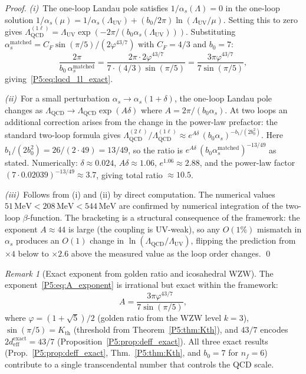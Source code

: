 \documentclass[11pt,a4paper]{article}
\theoremstyle{definition}
\theoremstyle{remark}
\newtheorem{remark}[theorem]{Remark}
\newcommand{\vp}{\varphi}
\newcommand{\LUV}{\Lambda_{\mathrm{UV}}}
\newcommand{\LQCD}{\Lambda_{\mathrm{QCD}}}
\begin{document}
\begin{proof}
\textit{(i)}\ The one-loop Landau pole satisfies
$1/\alpha_s(\Lambda)=0$ in the one-loop solution
$1/\alpha_s(\mu)=1/\alpha_s(\LUV)+(b_0/2\pi)\ln(\LUV/\mu)$.
Setting this to zero gives $\LQCD^{(1\ell)}=\LUV\exp(-2\pi/(b_0\alpha_s(\LUV)))$.
Substituting $\alpha_s^{\mathrm{matched}}=C_F\sin(\pi/5)/(2\vp^{43/7})$ with
$C_F=4/3$ and $b_0=7$:
\[
  \frac{2\pi}{b_0\,\alpha_s^{\mathrm{matched}}}
  = \frac{2\pi\cdot2\vp^{43/7}}{7\cdot(4/3)\sin(\pi/5)}
  = \frac{3\pi\vp^{43/7}}{7\sin(\pi/5)},
\]
giving~\eqref{P5:eq:lqcd_1l_exact}.

\textit{(ii)}\ For a small perturbation $\alpha_s\to\alpha_s(1+\delta)$,
the one-loop Landau pole changes as
$\LQCD\to\LQCD\exp(A\delta)$ where $A=2\pi/(b_0\alpha_s)$.
At two loops an additional correction arises from the change in the
power-law prefactor: the standard two-loop formula gives
$\LQCD^{(2\ell)}/\LQCD^{(1\ell)}\approx e^{A\delta}\,(b_0\alpha_s)^{-b_1/(2b_0^2)}$.
Here $b_1/(2b_0^2)=26/(2\cdot49)=13/49$, so the ratio is
$e^{A\delta}\,(b_0\alpha_s^{\mathrm{matched}})^{-13/49}$ as stated.
Numerically: $\delta\approx0.024$, $A\delta\approx1.06$,
$e^{1.06}\approx2.88$, and the power-law factor
$(7\cdot0.02039)^{-13/49}\approx3.7$, giving total ratio $\approx10.5$.

\textit{(iii)}\ Follows from (i) and (ii) by direct computation.
The numerical values $51\,\mathrm{MeV}<208\,\mathrm{MeV}<544\,\mathrm{MeV}$
are confirmed by numerical integration of the two-loop $\beta$-function.
The bracketing is a structural consequence of the framework: the exponent
$A\approx44$ is large (the coupling is UV-weak), so any $O(1\%)$ mismatch in
$\alpha_s$ produces an $O(1)$ change in $\ln(\LQCD/\LUV)$, flipping the
prediction from $\times 4$ below to $\times 2.6$ above the measured value
as the loop order changes.
\qed
\end{proof}

\begin{remark}[Exact exponent from golden ratio and icosahedral WZW]
\label{P5:rem:exact_exponent}
The exponent~\eqref{P5:eq:A_exponent} is irrational but exact within the
framework:
\[
  A = \frac{3\pi\vp^{43/7}}{7\sin(\pi/5)},
\]
where $\vp=(1+\sqrt5)/2$ (golden ratio from the WZW level $k=3$),
$\sin(\pi/5)=K_{\mathrm{th}}$ (threshold from Theorem~\ref{P5:thm:Kth}),
and $43/7$ encodes $2d_{\mathrm{eff}}^{\mathrm{exact}}=43/7$
(Proposition~\ref{P5:prop:deff_exact}).  All three exact results
(Prop.~\ref{P5:prop:deff_exact}, Thm.~\ref{P5:thm:Kth}, and $b_0=7$ for $n_f=6$)
contribute to a single transcendental number that controls the QCD scale.
\end{remark}
\end{document}
